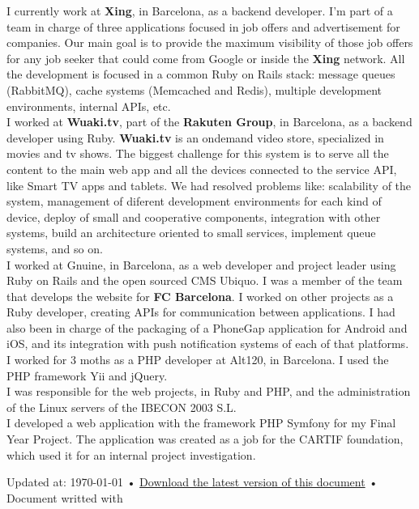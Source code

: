 \documentclass[10pt, a4paper]{article}
\begin{document}
\noindent{} I currently work at \textbf{Xing}, in Barcelona, as a backend developer. I'm part of a team in charge of three applications focused in job offers and advertisement for companies. Our main goal is to provide the maximum visibility of those job offers for any job seeker that could come from Google or inside the \textbf{Xing} network. All the development is focused in a common Ruby on Rails stack: message queues (RabbitMQ), cache systems (Memcached and Redis), multiple development environments, internal APIs, etc.\\[.2cm]
\noindent{} I worked at \textbf{Wuaki.tv}, part of the \textbf{Rakuten Group}, in Barcelona, as a backend developer using Ruby. \textbf{Wuaki.tv} is an ondemand video store, specialized in movies and tv shows. The biggest challenge for this system is to serve all the content to the main web app and all the devices connected to the service API, like Smart TV apps and tablets. We had resolved problems like: scalability of the system, management of diferent development environments for each kind of device, deploy of small and cooperative components, integration with other systems, build an architecture oriented to small services, implement queue systems, and so on.\\[.2cm]
\noindent{} I worked at Gnuine, in Barcelona, as a web developer and project leader using Ruby on Rails and the open sourced CMS Ubiquo. I was a member of the team that develops the website for \textbf{FC Barcelona}. I worked on other projects as a Ruby developer, creating APIs for communication between applications. I had also been in charge of the packaging of a PhoneGap application for Android and iOS, and its integration with push notification systems of each of that platforms.\\[.2cm]
\noindent{} I worked for 3 moths as a PHP developer at Alt120, in Barcelona. I used the PHP framework Yii and jQuery.\\[.2cm]
\noindent{} I was responsible for the web projects, in Ruby and PHP, and the administration of the Linux servers of the IBECON 2003 S.L.\\[.2cm]
\noindent{} I developed a web application with the framework PHP Symfony for my Final Year Project. The application was created as a job for the CARTIF foundation, which used it for an internal project investigation.


\begin{center}
{\scriptsize  Updated at: \today\- •\- \href{https://raw.github.com/jhbabon/cv/master/cv_en.pdf}{Download the latest version of this document}\- •\- Document writted with \href{http://nitens.org/taraborelli/cvtex}{\XeTeX}}
\end{center}
\end{document}
